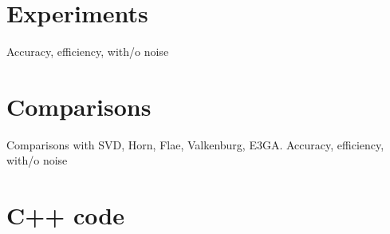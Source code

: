 \documentclass{birkjour}
\numberwithin{equation}{section}
\begin{document}



\section{Experiments}

Accuracy, efficiency, with/o noise

\section{Comparisons}

Comparisons with SVD, Horn, Flae, Valkenburg, E3GA. Accuracy, efficiency, with/o noise

\section{C++ code}
\end{document}

